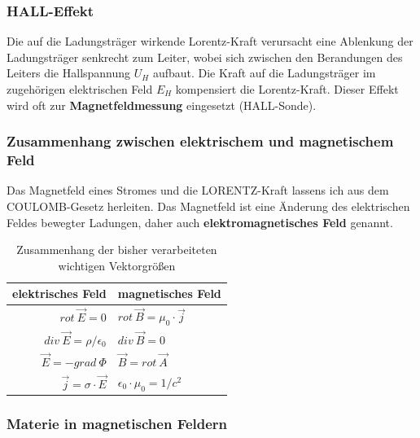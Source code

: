 \documentclass[12pt,a4paper,ngerman]{article}
\begin{document}
\pagebreak


\subsubsection*{HALL-Effekt}
Die auf die Ladungsträger wirkende Lorentz-Kraft verursacht eine Ablenkung der Ladungsträger senkrecht zum Leiter, wobei sich zwischen den Berandungen des Leiters die Hallspannung $U_H$ aufbaut. Die Kraft auf die Ladungsträger im zugehörigen elektrischen Feld $E_H$ kompensiert die Lorentz-Kraft. Dieser Effekt wird oft zur \textbf{Magnetfeldmessung} eingesetzt (HALL-Sonde). 

\subsubsection*{Zusammenhang zwischen elektrischem und magnetischem Feld}
Das Magnetfeld eines Stromes und die LORENTZ-Kraft lassens ich aus dem COULOMB-Gesetz herleiten. Das Magnetfeld ist eine Änderung des elektrischen Feldes bewegter Ladungen, daher auch \textbf{elektromagnetisches Feld} genannt. 
\begin{table}[h!]
  \begin{center}
    \begin{tabular}{| r |  l |}
    \hline
    elektrisches Feld & magnetisches Feld  \\ \hline \hline
    $rot \ \vec{E} = 0$ & 	$rot \ \vec{B} = \mu_0 \cdot \vec{j}$  \\ \hline
    $div \ \vec{E} = \rho / \epsilon_0$ & $div \ \vec{B} = 0$  \\ \hline
    $\vec{E} = -grad \ \Phi$ & $\vec{B} = rot \ \vec{A}$ \\ \hline
    $\vec{j} = \sigma \cdot \vec{E}$ & $\epsilon_0 \cdot \mu_0 = 1 / c^2$ \\
    \hline
    \end{tabular}
  \end{center}
  \caption{Zusammenhang der bisher verarbeiteten wichtigen Vektorgrößen}
\end{table}

\subsubsection*{Materie in magnetischen Feldern}
\end{document}
